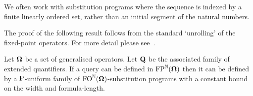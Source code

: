 \documentclass[../main/thesis.tex]{subfiles}
\begin{document}
We often work with substitution programs where the sequence is indexed by a
finite linearly ordered set, rather than an initial segment of the natural
numbers.

The proof of the following result follows from the standard `unrolling' of the
fixed-point operators. For more detail please see~\cite{}.

\begin{lem}
  Let $\mathbf{\mathbf{\Omega}}$ be a set of generalised operators. Let $\mathbf{Q}$ be the
  associated family of extended quantifiers. If a query can be defined in
  $\text{\upshape FP}^{\mathbb{N}} (\mathbf{\mathbf{\Omega}})$ then it can be defined by a $\mathrm{P}$-uniform family of
  $\text{\upshape FO}^{\mathbb{N}} (\mathbf{\mathbf{\Omega}})$-substitution programs with a constant bound on the
  width and formula-length.
  \label{lem:unroll-fixed-point}
\end{lem}


\end{document}
